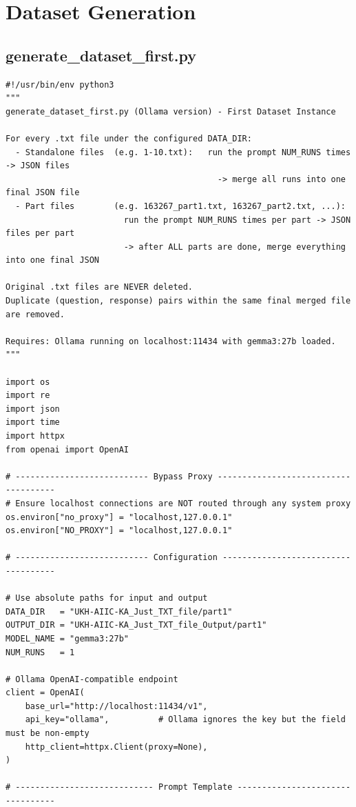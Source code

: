 \documentclass[11pt]{article}
\begin{document}
\newpage
\section{Dataset Generation}

\subsection{generate\_dataset\_first.py}
\begin{lstlisting}[style=pythonstyle, caption={generate\_dataset\_first.py}]
#!/usr/bin/env python3
"""
generate_dataset_first.py (Ollama version) - First Dataset Instance

For every .txt file under the configured DATA_DIR:
  - Standalone files  (e.g. 1-10.txt):   run the prompt NUM_RUNS times -> JSON files
                                           -> merge all runs into one final JSON file
  - Part files        (e.g. 163267_part1.txt, 163267_part2.txt, ...):
                        run the prompt NUM_RUNS times per part -> JSON files per part
                        -> after ALL parts are done, merge everything into one final JSON

Original .txt files are NEVER deleted.
Duplicate (question, response) pairs within the same final merged file are removed.

Requires: Ollama running on localhost:11434 with gemma3:27b loaded.
"""

import os
import re
import json
import time
import httpx
from openai import OpenAI

# --------------------------- Bypass Proxy -------------------------------------
# Ensure localhost connections are NOT routed through any system proxy
os.environ["no_proxy"] = "localhost,127.0.0.1"
os.environ["NO_PROXY"] = "localhost,127.0.0.1"

# --------------------------- Configuration ------------------------------------

# Use absolute paths for input and output
DATA_DIR   = "UKH-AIIC-KA_Just_TXT_file/part1"
OUTPUT_DIR = "UKH-AIIC-KA_Just_TXT_file_Output/part1" 
MODEL_NAME = "gemma3:27b"
NUM_RUNS   = 1

# Ollama OpenAI-compatible endpoint
client = OpenAI(
    base_url="http://localhost:11434/v1",
    api_key="ollama",          # Ollama ignores the key but the field must be non-empty
    http_client=httpx.Client(proxy=None),
)

# ---------------------------- Prompt Template ---------------------------------


\end{lstlisting}
\end{document}
